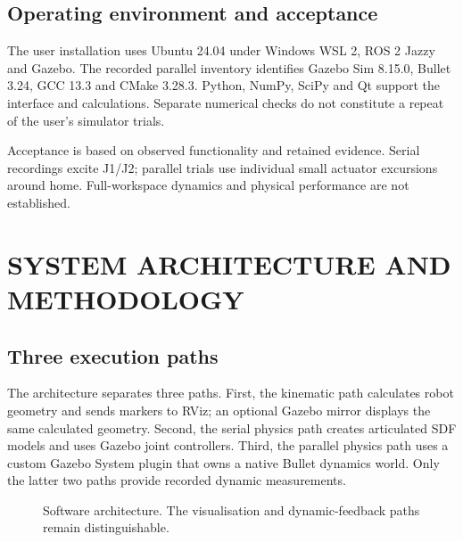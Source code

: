 \documentclass[11pt,a4paper,oneside]{report}
\begin{document}
\section{Operating environment and acceptance}
The user installation uses Ubuntu 24.04 under Windows WSL 2, ROS 2 Jazzy and Gazebo. The recorded parallel inventory identifies Gazebo Sim 8.15.0, Bullet 3.24, GCC 13.3 and CMake 3.28.3. Python, NumPy, SciPy and Qt support the interface and calculations. Separate numerical checks do not constitute a repeat of the user's simulator trials.

Acceptance is based on observed functionality and retained evidence. Serial recordings excite J1/J2; parallel trials use individual small actuator excursions around home. Full-workspace dynamics and physical performance are not established.

\chapter{SYSTEM ARCHITECTURE AND METHODOLOGY}
\section{Three execution paths}
The architecture separates three paths. First, the kinematic path calculates robot geometry and sends markers to RViz; an optional Gazebo mirror displays the same calculated geometry. Second, the serial physics path creates articulated SDF models and uses Gazebo joint controllers. Third, the parallel physics path uses a custom Gazebo System plugin that owns a native Bullet dynamics world. Only the latter two paths provide recorded dynamic measurements.
\begin{figure}[H]\centering
{}
\caption{Software architecture. The visualisation and dynamic-feedback paths remain distinguishable.}
\end{figure}
\end{document}
